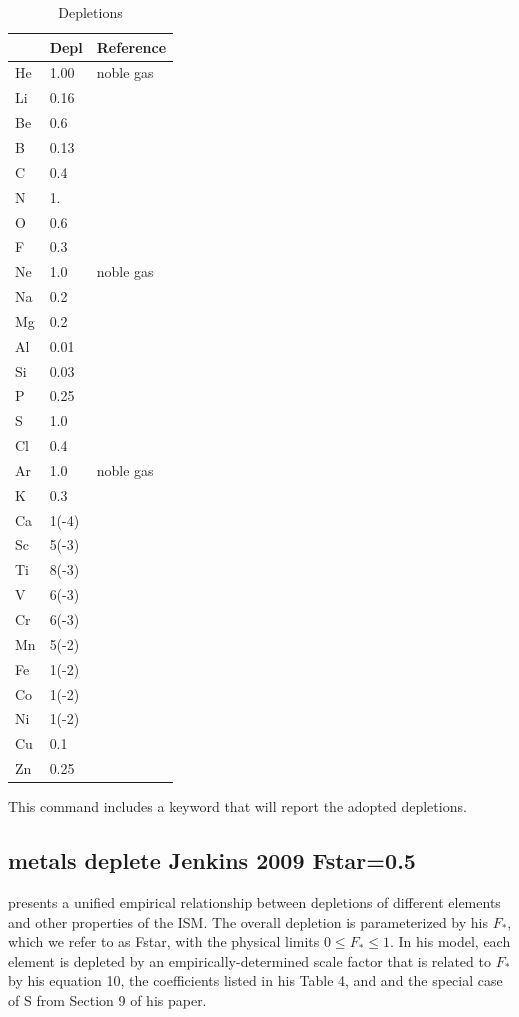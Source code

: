\begin{table}
\centering
\caption{Depletions}
\label{tab:GrainGasDepletionFactors}
\begin{tabular}{lll}\hline
&Depl& Reference\\
\hline
He& 1.00& noble gas\\
Li& 0.16& \citealp{White1986}\\
Be& 0.6& \citealp{York1982}\\
B& 0.13& \citealp{Federman1993}\\
C& 0.4\\
N& 1.\\
O& 0.6\\
F& 0.3& \citealp{Snow1981}\\
Ne& 1.0& noble gas\\
Na& 0.2\\
Mg& 0.2\\
Al& 0.01\\
Si& 0.03\\
P& 0.25& \citealp{Cardelli1991}\\
S& 1.0\\
Cl& 0.4\\
Ar&1.0& noble gas\\
K& 0.3& \citealp{Chaffee1982}\\
Ca& 1(-4)\\
Sc& 5(-3)& \citealp{Snow1980}\\
Ti& 8(-3)& \citealp{Crinklaw1994}\\
V& 6(-3)& \citealp{Cardelli1994}\\
Cr& 6(-3)& \citealp{Cardelli1991}\\
Mn& 5(-2)& \citealp{Cardelli1991}\\
Fe& 1(-2)\\
Co& 1(-2)\\
Ni& 1(-2)\\
Cu& 0.1& \citealp{Cardelli1991}\\
Zn& 0.25& \citealp{Cardelli1991}\\
\hline
\end{tabular}
\end{table}

This command includes a  keyword that will  report
the adopted depletions.


\subsection{metals deplete Jenkins 2009 Fstar=0.5}

\citet{2009ApJ...700.1299J} presents a unified empirical relationship between depletions
of different elements and other properties of the ISM.  
The overall depletion is parameterized by his $F_*$, which we refer to as Fstar,
with the physical limits $0\leq F_* \leq 1$.
In his model, each element is depleted by an empirically-determined scale factor that
is related to $F_*$ by his equation 10, the coefficients listed in his Table 4, 
and and the special case of S from Section 9 of his paper.


